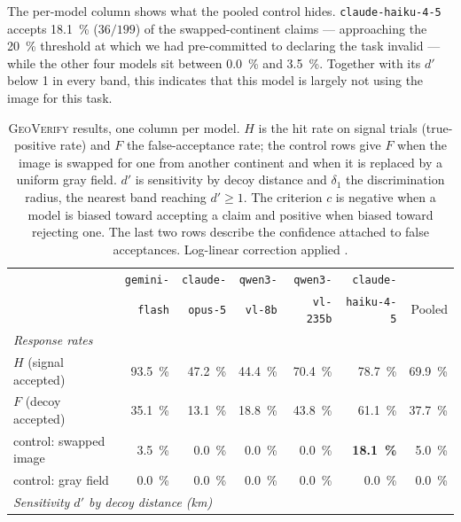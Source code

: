 \documentclass[10pt,a4paper]{article}
\begin{document}
The per-model column shows what the pooled control hides.
\texttt{claude-haiku-4-5} accepts \SI{18.1}{\percent} ($36/199$) of the
swapped-continent claims --- approaching the \SI{20}{\percent} threshold at
which we had pre-committed to declaring the task invalid --- while the other
four models sit between \SI{0.0}{\percent} and \SI{3.5}{\percent}. Together with
its $d'$ below \num{1} in every band, this indicates that this model is largely
not using the image for this task.

\begin{table}[!htbp]
\centering
\small
\caption{\textsc{GeoVerify} results, one column per model. $H$ is the hit rate
on signal trials (true-positive rate) and $F$ the false-acceptance rate; the
control rows give $F$ when the image is swapped for one from another continent
and when it is replaced by a uniform gray field. $d'$ is sensitivity by decoy
distance and $\delta_1$ the discrimination radius, the nearest band reaching
$d' \geq 1$. The criterion $c$ is negative when a model is biased toward
accepting a claim and positive when biased toward rejecting one. The last two
rows describe the confidence attached to false acceptances. Log-linear
correction applied \citep{hautus1995}.}
\label{tab:verify}
\begin{tabular}{lrrrrrr}
\toprule
& \texttt{gemini-} & \texttt{claude-} & \texttt{qwen3-} & \texttt{qwen3-} & \texttt{claude-} & \\
& \texttt{flash} & \texttt{opus-5} & \texttt{vl-8b} & \texttt{vl-235b} & \texttt{haiku-4-5} & Pooled \\
\midrule
\multicolumn{7}{l}{\emph{Response rates}} \\
$H$ (signal accepted)      & \SI{93.5}{\percent} & \SI{47.2}{\percent} & \SI{44.4}{\percent} & \SI{70.4}{\percent} & \SI{78.7}{\percent} & \SI{69.9}{\percent} \\
$F$ (decoy accepted)       & \SI{35.1}{\percent} & \SI{13.1}{\percent} & \SI{18.8}{\percent} & \SI{43.8}{\percent} & \SI{61.1}{\percent} & \SI{37.7}{\percent} \\
\quad control: swapped image & \SI{3.5}{\percent} & \SI{0.0}{\percent} & \SI{0.0}{\percent} & \SI{0.0}{\percent} & \textbf{\SI{18.1}{\percent}} & \SI{5.0}{\percent} \\
\quad control: gray field  & \SI{0.0}{\percent} & \SI{0.0}{\percent} & \SI{0.0}{\percent} & \SI{0.0}{\percent} & \SI{0.0}{\percent} & \SI{0.0}{\percent} \\
\midrule
\multicolumn{7}{l}{\emph{Sensitivity $d'$ by decoy distance (\si{\kilo\metre})}} \\

\end{tabular}
\end{table}
\end{document}
